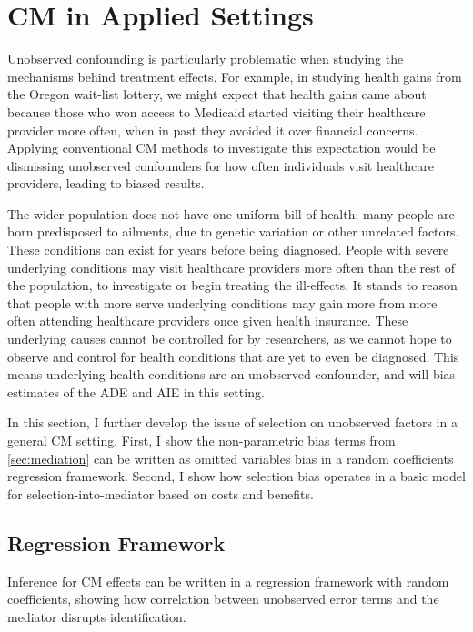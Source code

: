 \section{CM in Applied Settings}
\label{sec:applied}
Unobserved confounding is particularly problematic when studying the mechanisms behind treatment effects.
For example, in studying health gains from the Oregon wait-list lottery, we might expect that health gains came about because those who won access to Medicaid started visiting their healthcare provider more often, when in past they avoided it over financial concerns.
Applying conventional CM methods to investigate this expectation would be dismissing unobserved confounders for how often individuals visit healthcare providers, leading to biased results.

The wider population does not have one uniform bill of health; many people are born predisposed to ailments, due to genetic variation or other unrelated factors.
These conditions can exist for years before being diagnosed.
People with severe underlying conditions may visit healthcare providers more often than the rest of the population, to investigate or begin treating the ill-effects.
It stands to reason that people with more serve underlying conditions may gain more from more often attending healthcare providers once given health insurance.
These underlying causes cannot be controlled for by researchers, as we cannot hope to observe and control for health conditions that are yet to even be diagnosed.
This means underlying health conditions are an unobserved confounder, and will bias estimates of the ADE and AIE in this setting.

In this section, I further develop the issue of selection on unobserved factors in a general CM setting.
First, I show the non-parametric bias terms from \autoref{sec:mediation} can be written as omitted variables bias in a random coefficients regression framework.
Second, I show how selection bias operates in a basic model for selection-into-mediator based on costs and benefits.

\subsection{Regression Framework}
\label{sec:regression}
Inference for CM effects can be written in a regression framework with random coefficients, showing how correlation between unobserved error terms and the mediator disrupts identification.

